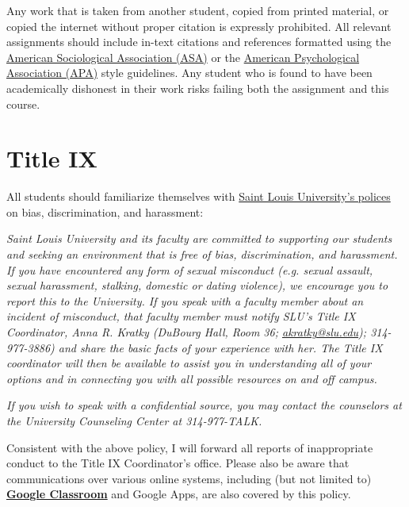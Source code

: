 \documentclass{tufte-book}
\begin{document}
\vspace{3mm}
\noindent Any work that is taken from another student, copied from printed material, or copied the internet without proper citation is expressly prohibited. All relevant assignments should include in-text citations and references formatted using the \href{http://owl.english.purdue.edu/owl/resource/583/02/}{American Sociological Association (ASA)} or the \href{https://owl.english.purdue.edu/owl/resource/560/01/}{American Psychological Association (APA)} style guidelines. Any student who is found to have been academically dishonest in their work risks failing both the assignment and this course.

\vspace{3mm}
\section{Title IX}
All students should familiarize themselves with \href{http://www.slu.edu/general-counsel-home/office-of-institutional-equity-and-diversity}{Saint Louis University's polices} on bias, discrimination, and harassment:

\vspace{3mm}
\begin{adjustwidth}{1cm}{}
\textit{Saint Louis University and its faculty are committed to supporting our students and seeking an environment that is free of bias, discrimination, and harassment. If you have encountered any form of sexual misconduct (e.g. sexual assault, sexual harassment, stalking, domestic or dating violence), we encourage you to report this to the University. If you speak with a faculty member about an incident of misconduct, that faculty member must notify SLU's Title IX Coordinator, Anna R. Kratky (DuBourg Hall, Room 36; \href{mailto:akratky@slu.edu}{akratky@slu.edu}); 314-977-3886) and share the basic facts of your experience with her. The Title IX coordinator will then be available to assist you in understanding all of your options and in connecting you with all possible resources on and off campus.}
\vspace{2mm} \par \noindent \textit{If you wish to speak with a confidential source, you may contact the counselors at the University Counseling Center at 314-977-TALK.}
\end{adjustwidth}

\vspace{3mm}
\noindent Consistent with the above policy, I will forward all reports of inappropriate conduct to the Title IX Coordinator's office. Please also be aware that communications over various online systems, including (but not limited to) \textbf{\href{https://classroom.google.com}{Google Classroom}} and Google Apps, are also covered by this policy.
\end{document}
